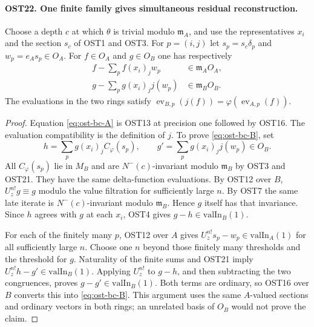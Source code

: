 \paragraph{OST22. One finite family gives simultaneous residual reconstruction.}
\label{claim:OST22}
Choose a depth $c$ at which $\theta$ is trivial modulo
$\mathfrak m_A$, and use the representatives $x_i$ and
the section $s_c$ of OST1 and OST3.  For
$p=(i,j)$ let $s_p=s_c\delta_p$ and $w_p=e_A s_p\in O_A$.
For $f\in O_A$ and $g\in O_B$ one has respectively
\begin{align}
 f-\sum_p f(x_i)_j w_p&\in\mathfrak m_AO_A,\label{eq:ost-bc-A}\\
 g-\sum_p g(x_i)_j j(w_p)&\in\mathfrak m_BO_B.
 \label{eq:ost-bc-B}
\end{align}
The evaluations in the two rings satisfy
$\operatorname{ev}_{B,p}(j(f))=\varphi(\operatorname{ev}_{A,p}(f))$.
\begin{proof}
Equation \eqref{eq:ost-bc-A} is OST13 at precision one
followed by OST16.  The evaluation compatibility is the
definition of $j$.  To prove \eqref{eq:ost-bc-B}, set
\[
 h=\sum_p g(x_i)_j C_\varphi(s_p),\qquad
 g'=\sum_p g(x_i)_j j(w_p)\in O_B.
\]
All $C_\varphi(s_p)$ lie in $M_B$ and are
$N^-(c)$-invariant modulo $\mathfrak m_B$ by OST3 and
OST21.  They have the same delta-function evaluations.
By OST12 over $B$, $U_z^{n!}g\equiv g$ modulo the
value filtration for sufficiently large $n$.  By OST7
the same late iterate is $N^-(c)$-invariant modulo
$\mathfrak m_B$.  Hence $g$ itself has that invariance.
Since $h$ agrees with $g$ at each $x_i$, OST4 gives
$g-h\in\mathrm{valIn}_B(1)$.

For each of the finitely many $p$, OST12 over $A$ gives
$U_z^{n!}s_p-w_p\in\mathrm{valIn}_A(1)$ for all
sufficiently large $n$.  Choose one $n$ beyond those
finitely many thresholds and the threshold for $g$.
Naturality of the finite sums and OST21 imply
$U_z^{n!}h-g'\in\mathrm{valIn}_B(1)$.
Applying $U_z^{n!}$ to $g-h$, and then subtracting the
two congruences, proves $g-g'\in\mathrm{valIn}_B(1)$.
Both terms are ordinary, so OST16 over $B$ converts this
into \eqref{eq:ost-bc-B}.  This argument uses the same
$A$-valued sections and ordinary vectors in both rings;
an unrelated basis of $O_B$ would not prove the claim.
\end{proof}

